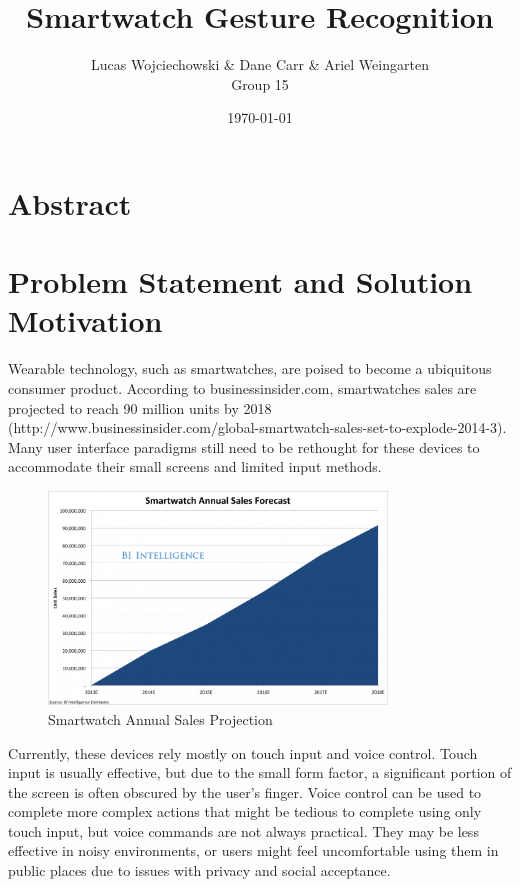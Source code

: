 \documentclass{report}
\title{Smartwatch Gesture Recognition}
\date{\today}
\author{
  Lucas Wojciechowski \& Dane Carr \& Ariel Weingarten \\
  Group 15
}
\begin{document}
\maketitle


\chapter{Abstract}


\chapter{Problem Statement and Solution Motivation}
Wearable technology, such as smartwatches, are poised to become a ubiquitous consumer product. According to businessinsider.com, smartwatches sales are projected to reach 90 million units by 2018 (http://www.businessinsider.com/global-smartwatch-sales-set-to-explode-2014-3). Many user interface paradigms still need to be rethought for these devices to accommodate their small screens and limited input methods.

\begin{figure}[ht!]
  \centering
  \includegraphics[width=90mm]{smartwatch.png}
  \caption{Smartwatch Annual Sales Projection \label{overflow}}
\end{figure}

Currently, these devices rely mostly on touch input and voice control. Touch input is usually effective, but due to the small form factor, a significant portion of the screen is often obscured by the user's finger. Voice control can be used to complete more complex actions that might be tedious to complete using only touch input, but voice commands are not always practical. They may be less effective in noisy environments, or users might feel uncomfortable using them in public places due to issues with privacy and social acceptance.
\end{document}
